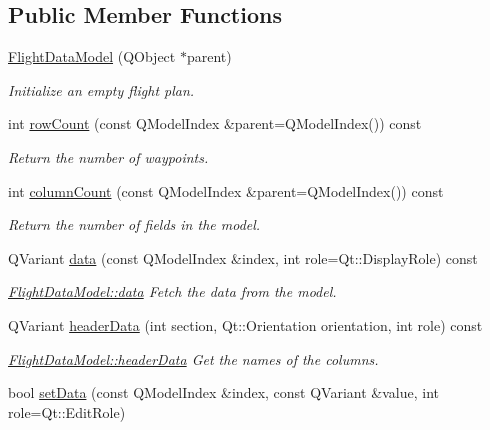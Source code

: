 \subsection*{\-Public \-Member \-Functions}
\begin{DoxyCompactItemize}
\item 
\hyperlink{group___path_ga777bf842aa77abc4db16f1275fac0df0}{\-Flight\-Data\-Model} (\-Q\-Object $\ast$parent)
\begin{DoxyCompactList}\small\item\em \-Initialize an empty flight plan. \end{DoxyCompactList}\item 
int \hyperlink{group___path_ga7c8a098e7b8a37867261f0036502a4fc}{row\-Count} (const \-Q\-Model\-Index \&parent=\-Q\-Model\-Index()) const 
\begin{DoxyCompactList}\small\item\em \-Return the number of waypoints. \end{DoxyCompactList}\item 
int \hyperlink{group___path_gab6781580d20ed0e89768eafa799856d4}{column\-Count} (const \-Q\-Model\-Index \&parent=\-Q\-Model\-Index()) const 
\begin{DoxyCompactList}\small\item\em \-Return the number of fields in the model. \end{DoxyCompactList}\item 
\-Q\-Variant \hyperlink{group___path_ga3314e011bb5ed88b34ab33bf8f94d41e}{data} (const \-Q\-Model\-Index \&index, int role=\-Qt\-::\-Display\-Role) const 
\begin{DoxyCompactList}\small\item\em \hyperlink{group___path_ga3314e011bb5ed88b34ab33bf8f94d41e}{\-Flight\-Data\-Model\-::data} \-Fetch the data from the model. \end{DoxyCompactList}\item 
\-Q\-Variant \hyperlink{group___path_gaa4c59e9669bd77cd6475133fcf529bad}{header\-Data} (int section, \-Qt\-::\-Orientation orientation, int role) const 
\begin{DoxyCompactList}\small\item\em \hyperlink{group___path_gaa4c59e9669bd77cd6475133fcf529bad}{\-Flight\-Data\-Model\-::header\-Data} \-Get the names of the columns. \end{DoxyCompactList}\item 
bool \hyperlink{group___path_ga8931eaae5c2004c4d42233bcdad3ee4d}{set\-Data} (const \-Q\-Model\-Index \&index, const \-Q\-Variant \&value, int role=\-Qt\-::\-Edit\-Role)

\end{DoxyCompactItemize}

